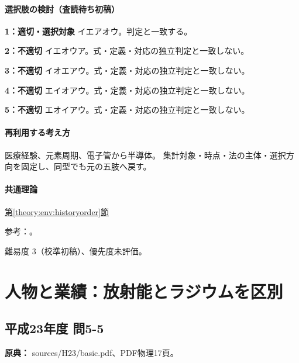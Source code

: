 \paragraph{選択肢の検討（査読待ち初稿）}\mbox{}\par

\noindent\textbf{1：適切・選択対象} イエアオウ。判定と一致する。\par

\noindent\textbf{2：不適切} イエオウア。式・定義・対応の独立判定と一致しない。\par

\noindent\textbf{3：不適切} イオエアウ。式・定義・対応の独立判定と一致しない。\par

\noindent\textbf{4：不適切} エイオアウ。式・定義・対応の独立判定と一致しない。\par

\noindent\textbf{5：不適切} エオイアウ。式・定義・対応の独立判定と一致しない。\par

\paragraph{再利用する考え方} 医療経験、元素周期、電子管から半導体。 集計対象・時点・法の主体・選択方向を固定し、同型でも元の五肢へ戻す。

\paragraph{共通理論} \hyperref[theory:env:historyorder]{第\ref*{theory:env:historyorder}節}

\par 参考：\cite{env59_jenner,env58_curie}。

\par 難易度 3（校準初稿）、優先度未評価。

\section{人物と業績：放射能とラジウムを区別}

\subsection{平成23年度 問5-5}
\label{q:h23-reg-basic-5-5}

\noindent\textbf{原典：} sources/H23/basic.pdf、PDF物理17頁。

